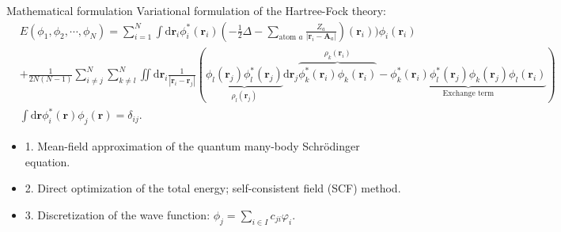 \documentclass[aspectratio=169]{beamer}
\begin{document}
\begin{frame}{Mathematical formulation}
	Variational formulation of the Hartree-Fock theory:
	\begin{equation*}
		\begin{aligned}
			& E(\phi_1, \phi_2, \cdots, \phi_N) = 
	\sum_{i=1}^N \int\text{d}\mathbf{r}_i
		  \phi_i^*(\mathbf{r}_i) (-\frac{1}{2}\Delta - \sum_{\text{atom } a}
			\frac{Z_a}{|\mathbf{r}_i - \mathbf{A}_a|})(\mathbf{r}_i))
			 \phi_i(\mathbf{r}_i) \\ 
			&+ \frac{1}{2N(N - 1)} \sum_{i \neq j}^N \sum_{k \neq l}^N \iint
			\mathrm{d}\mathbf{r}_i
			\frac{1}{|\mathbf{r}_i-\mathbf{r}_j|}
			\left(\underbrace{\phi_l(\mathbf{r}_j)\phi_l^*(\mathbf{r}_j)}_{\rho_l(\mathbf{r}_j)}
			\text{d}\mathbf{r}_j \overbrace{\phi_k^*(\mathbf{r}_i)\phi_k(\mathbf{r}_i)
			}^{\rho_k(\mathbf{r}_i)} - \underbrace{\phi_k^*(\mathbf{r}_i)\phi_l^*(\mathbf{r}_j)
			\phi_k(\mathbf{r}_j)\phi_l(\mathbf{r}_i)}_{\text{Exchange term}}\right)  \\
      & \int\text{d}\mathbf{r}
		  \phi_i^*(\mathbf{r}) \phi_j(\mathbf{r}) = \delta_{ij}.
		\end{aligned}
	\end{equation*}
	\begin{itemize}
		\item 1. Mean-field approximation of the quantum many-body Schr\"odinger equation.
		\item 2. Direct optimization of the total energy; self-consistent field (SCF) method.
		\item 3. Discretization of the wave function: $\phi_j = \sum_{i\in I} c_{ji}\varphi_i$.
	\end{itemize}
\end{frame}
\end{document}

